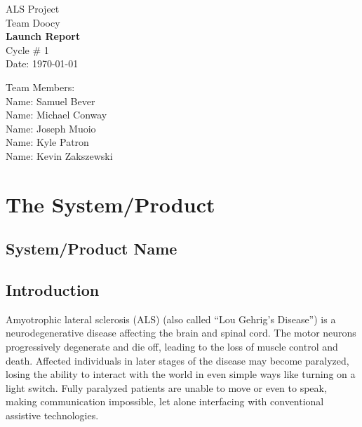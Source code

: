 \documentclass{report}
\begin{document}
\begin{titlepage}
    \begin{center}
        \begin{huge}
        ALS Project \\[1cm]
        Team Doocy \\[2.2cm]
        { \bfseries Launch Report } \\[1cm]
        Cycle \# 1\\[2.2cm]
        Date: \required\today\\[1cm]
        \end{huge}
    \end{center}
    \null \vfill
    \begin{large}
        Team Members: \\[0.5cm]
        Name: Samuel Bever\\[0.5cm]
        Name: Michael Conway\\[0.5cm]
        Name: Joseph Muoio\\[0.5cm]
        Name: Kyle Patron\\[0.5cm]
        Name: Kevin Zakszewski
    \end{large}
\end{titlepage}

\section*{\centering The System/Product}

\subsection*{System/Product Name}


\subsection*{Introduction}

Amyotrophic lateral sclerosis (ALS) (also called ``Lou Gehrig's Disease'') is
a neurodegenerative disease affecting the brain and spinal cord. The motor
neurons progressively degenerate and die off, leading to the loss of muscle
control and death. Affected individuals in later stages of the disease may
become paralyzed, losing the ability to interact with the world in even simple
ways like turning on a light switch. Fully paralyzed patients are unable to
move or even to speak, making communication impossible, let alone interfacing
with conventional assistive technologies.
\end{document}
